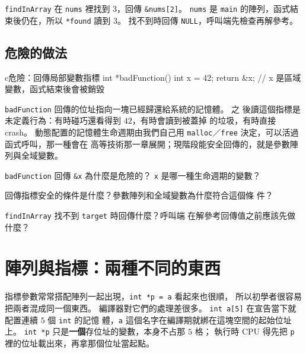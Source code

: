 
\texttt{findInArray} 在 \texttt{nums} 裡找到 $3$，回傳
\texttt{\&nums[2]}。 \texttt{nums} 是 \texttt{main} 的陣列，函式結
束後仍在，所以 \texttt{*found} 讀到 $3$。 找不到時回傳
\texttt{NULL}，呼叫端先檢查再解參考。

\subsection{危險的做法}

\begin{code}{c}{危險：回傳局部變數指標}
int *badFunction() {
    int x = 42;
    return &x;      // x 是區域變數，函式結束後會被銷毀
}
\end{code}

\texttt{badFunction} 回傳的位址指向一塊已經歸還給系統的記憶體。 之
後讀這個指標是未定義行為：有時碰巧還看得到 $42$，有時會讀到被蓋掉
的垃圾，有時直接 crash。 動態配置的記憶體生命週期由我們自己用
\texttt{malloc}／\texttt{free} 決定，可以活過函式呼叫，那一種會在
高等技術那一章展開；現階段能安全回傳的，就是參數陣列與全域變數。


\begin{drills}[label=drills:ptr-return-lifetime]
\item \texttt{badFunction} 回傳 \texttt{\&x} 為什麼是危險的？
\texttt{x} 是哪一種生命週期的變數？
\item 回傳指標安全的條件是什麼？參數陣列和全域變數為什麼符合這個條
件？
\item \texttt{findInArray} 找不到 \texttt{target} 時回傳什麼？呼叫端
在解參考回傳值之前應該先做什麼？
\end{drills}

\section{陣列與指標：兩種不同的東西}
\label{sec:ptr-array-vs-pointer}

指標參數常常搭配陣列一起出現，\texttt{int *p = a} 看起來也很順，
所以初學者很容易把兩者混成同一個東西。 編譯器對它們的處理差很多。
\texttt{int a[5]} 在宣告當下就配置連續 $5$ 個 \texttt{int} 的記憶
體，\texttt{a} 這個名字在編譯期就綁在這塊空間的起始位址上。
\texttt{int *p} 只是\textbf{一個}存位址的變數，本身不占那 $5$ 格；
執行時 CPU 得先把 \texttt{p} 裡的位址載出來，再拿那個位址當起點。

